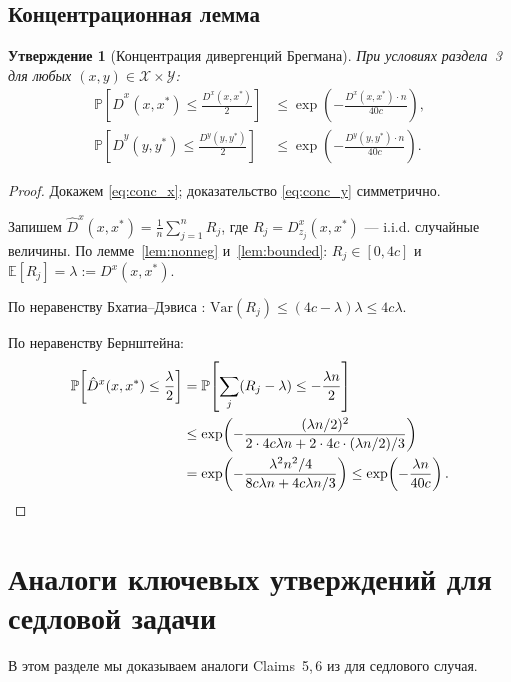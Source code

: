 \documentclass[12pt,a4paper]{article}
\theoremstyle{plain}
\newtheorem{claim}[theorem]{Утверждение}
\theoremstyle{definition}
\newcommand{\E}{\mathbb{E}}
\renewcommand{\Pr}{\mathbb{P}}
\newcommand{\cX}{\mathcal{X}}
\newcommand{\cY}{\mathcal{Y}}
\newcommand{\hatD}{\hat{D}}
\begin{document}
\subsection{Концентрационная лемма}

\begin{claim}[Концентрация дивергенций Брегмана]
\label{claim:concentration}
При условиях раздела~3 для любых $(x,y)\in\cX\times\cY$:
\begin{align}
    \Pr\!\left[\hatD^x(x,x^*)\le\frac{D^x(x,x^*)}{2}\right]&\le\exp\!\left(-\frac{D^x(x,x^*)\cdot n}{40c}\right),\label{eq:conc_x}\\
    \Pr\!\left[\hatD^y(y,y^*)\le\frac{D^y(y,y^*)}{2}\right]&\le\exp\!\left(-\frac{D^y(y,y^*)\cdot n}{40c}\right).\label{eq:conc_y}
\end{align}
\end{claim}

\begin{proof}
Докажем \eqref{eq:conc_x}; доказательство \eqref{eq:conc_y} симметрично.

Запишем $\hatD^x(x,x^*)=\frac{1}{n}\sum_{j=1}^n R_j$, где $R_j=D_{z_j}^x(x,x^*)$ --- i.i.d. случайные величины. По лемме~\ref{lem:nonneg} и~\ref{lem:bounded}: $R_j\in[0,4c]$ и $\E[R_j]=\lambda:=D^x(x,x^*)$.

По неравенству Бхатиа--Дэвиса \cite{BhatiaDavis2000}: $\mathrm{Var}(R_j)\le(4c-\lambda)\lambda\le 4c\lambda$.

По неравенству Бернштейна:
\begin{align*}
    \Pr\!\left[\hatD^x(x,x^*)\le\frac{\lambda}{2}\right]
    &=\Pr\!\left[\sum_j(R_j-\lambda)\le-\frac{\lambda n}{2}\right]\\
    &\le\exp\!\left(-\frac{(\lambda n/2)^2}{2\cdot 4c\lambda n+2\cdot 4c\cdot(\lambda n/2)/3}\right)\\
    &=\exp\!\left(-\frac{\lambda^2 n^2/4}{8c\lambda n+4c\lambda n/3}\right)
    \le\exp\!\left(-\frac{\lambda n}{40c}\right).\qedhere
\end{align*}
\end{proof}

\section{Аналоги ключевых утверждений для седловой задачи}

В этом разделе мы доказываем аналоги Claims~5,\,6 из \cite{CLY2023} для седлового случая.
\end{document}
